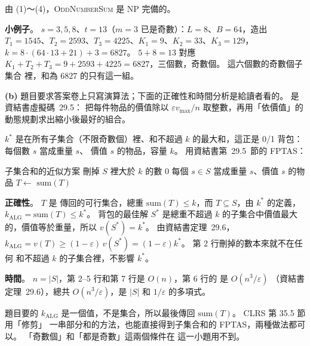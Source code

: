 \begin{pastsoln}
由 (1)～(4)，\textsc{OddNumberSum} 是 NP 完備的。

\textbf{小例子}。 $s = 3, 5, 8$、$t = 13$（$m = 3$ 已是奇數）：$L = 8$、$B = 64$，造出
$T_1 = 1545$、$T_2 = 2593$、$T_3 = 4225$、$K_1 = 9$、$K_2 = 33$、$K_3 = 129$，$k = 8 \cdot (64 \cdot 13 + 21) +
3 = 6827$。 $5 + 8 = 13$ 對應 $K_1 + T_2 + T_3 = 9 + 2593 + 4225 = 6827$，三個數，奇數個。 這六個數的奇數個子集合
裡，和為 $6827$ 的只有這一組。


\textbf{(b)} 題目要求答案卷上只寫演算法；下面的正確性和時間分析是給讀者看的。  是資結書虛擬碼~29.5：
把每件物品的價值除以 $\varepsilon v_{\max}/n$ 取整數，再用「依價值」的動態規劃求出縮小後最好的組合。

$k^*$ 是在所有子集合（不限奇數個）裡、和不超過 $k$ 的最大和，這正是 0/1 背包：每個數 $s$ 當成重量 $s$、
價值 $s$ 的物品，容量 $k$。 用資結書第~29.5~節的 FPTAS：

\begin{pseudo}{子集合和的近似方案}
    \State 刪掉 $S$ 裡大於 $k$ 的數
        \State \Return $0$ 
    \EndIf
    \State 每個 $s \in S$ 當成重量 $s$、價值 $s$ 的物品
    \State $T \gets$ 
    \State \Return $\mathrm{sum}(T)$
\EndFunction
\end{pseudo}

\textbf{正確性}。 $T$ 是  傳回的可行集合，總重 $\mathrm{sum}(T) \le k$，而
$T \subseteq S$，由 $k^*$ 的定義，$k_{\mathrm{ALG}} = \mathrm{sum}(T) \le k^*$。 背包的最佳解 $S^*$ 是總重不超過
$k$ 的子集合中價值最大的，價值等於重量，所以 $v(S^*) = k^*$。 由資結書定理~29.6，
$k_{\mathrm{ALG}} = v(T) \ge (1 - \varepsilon)\, v(S^*) = (1 - \varepsilon) k^*$。 第 2 行刪掉的數本來就不在任何
和不超過 $k$ 的子集合裡，不影響 $k^*$。

\textbf{時間}。 $n = |S|$，第 2--5 行和第 7 行是 $O(n)$，第 6 行的  是 $O(n^3/\varepsilon)$
（資結書定理~29.6），總共 $O(n^3/\varepsilon)$，是 $|S|$ 和 $1/\varepsilon$ 的多項式。

題目要的 $k_{\mathrm{ALG}}$ 是一個值，不是集合，所以最後傳回 $\mathrm{sum}(T)$。 CLRS 第 35.5 節用「修剪」
一串部分和的方法，也能直接得到子集合和的 FPTAS，兩種做法都可以。 「奇數個」和「都是奇數」這兩個條件在
這一小題用不到。
\end{pastsoln}
